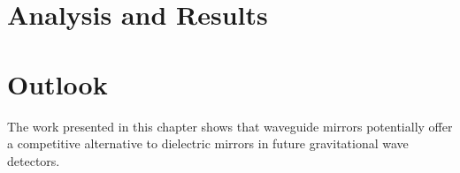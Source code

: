 \section{Analysis and Results}

\section{Outlook}

The work presented in this chapter shows that waveguide mirrors potentially offer a competitive alternative to dielectric mirrors in future gravitational wave detectors.

